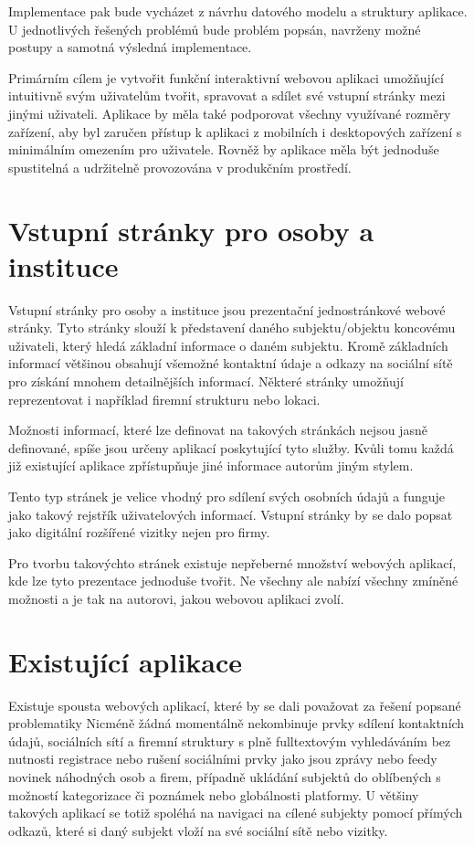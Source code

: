 Implementace pak bude vycházet z návrhu datového modelu a struktury aplikace.
U jednotlivých řešených problémů bude problém popsán, navrženy možné postupy a samotná výsledná implementace.

Primárním cílem je vytvořit funkční interaktivní webovou aplikaci umožňující intuitivně svým uživatelům
tvořit, spravovat a sdílet své vstupní stránky mezi jinými uživateli.
Aplikace by měla také podporovat všechny využívané rozměry zařízení, aby byl zaručen přístup k aplikaci z mobilních
i desktopových zařízení s minimálním omezením pro uživatele.
Rovněž by aplikace měla být jednoduše spustitelná a udržitelně provozována v produkčním prostředí.

\section{Vstupní stránky pro osoby a instituce}

Vstupní stránky pro osoby a instituce jsou prezentační jednostránkové webové stránky.
Tyto stránky slouží k představení daného subjektu/objektu koncovému uživateli, který hledá základní
informace o daném subjektu.
Kromě základních informací většinou obsahují všemožné kontaktní údaje a odkazy na sociální sítě pro
získání mnohem detailnějších informací.
Některé stránky umožňují reprezentovat i například firemní strukturu nebo lokaci.

Možnosti informací, které lze definovat na takových stránkách nejsou jasně definované, spíše jsou
určeny aplikací poskytující tyto služby.
Kvůli tomu každá již existující aplikace zpřístupňuje jiné informace autorům jiným stylem.

Tento typ stránek je velice vhodný pro sdílení svých osobních údajů a funguje jako takový rejstřík uživatelových
informací.
Vstupní stránky by se dalo popsat jako digitální rozšířené vizitky nejen pro firmy.

Pro tvorbu takovýchto stránek existuje nepřeberné množství webových aplikací, kde lze
tyto prezentace jednoduše tvořit.
Ne všechny ale nabízí všechny zmíněné možnosti a je tak na autorovi, jakou webovou aplikaci zvolí.

\section{Existující aplikace}

Existuje spousta webových aplikací, které by se dali považovat za řešení popsané problematiky
Nicméně žádná momentálně nekombinuje prvky sdílení kontaktních údajů, sociálních sítí a firemní struktury s plně
fulltextovým vyhledáváním bez nutnosti registrace nebo rušení sociálními prvky jako jsou zprávy nebo feedy novinek
náhodných osob a firem, případně ukládání subjektů do oblíbených s možností kategorizace či poznámek nebo globálnosti
platformy.
U většiny takových aplikací se totiž spoléhá na navigaci na cílené subjekty pomocí přímých odkazů, které si daný subjekt
vloží na své sociální sítě nebo vizitky.

